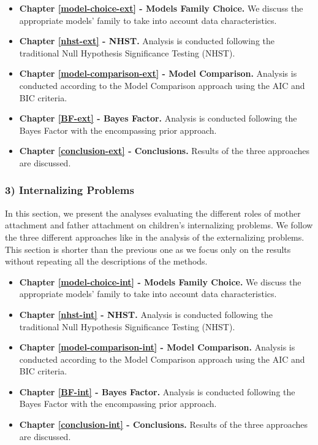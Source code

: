 \documentclass[
]{book}
\providecommand{\tightlist}{%
  \setlength{\itemsep}{0pt}\setlength{\parskip}{0pt}}
\begin{document}
\begin{itemize}
\tightlist
\item
  \textbf{Chapter \ref{model-choice-ext} - Models Family Choice.} We discuss the appropriate models' family to take into account data characteristics.
\item
  \textbf{Chapter \ref{nhst-ext} - NHST.} Analysis is conducted following the traditional Null Hypothesis Significance Testing (NHST).
\item
  \textbf{Chapter \ref{model-comparison-ext} - Model Comparison.} Analysis is conducted according to the Model Comparison approach using the AIC and BIC criteria.
\item
  \textbf{Chapter \ref{BF-ext} - Bayes Factor.} Analysis is conducted following the Bayes Factor with the encompassing prior approach.
\item
  \textbf{Chapter \ref{conclusion-ext} - Conclusions.} Results of the three approaches are discussed.
\end{itemize}

\hypertarget{internalizing-problems}{%
\subsubsection*{3) Internalizing Problems}\label{internalizing-problems}}

In this section, we present the analyses evaluating the different roles of mother attachment and father attachment on children's internalizing problems. We follow the three different approaches like in the analysis of the externalizing problems. This section is shorter than the previous one as we focus only on the results without repeating all the descriptions of the methods.

\begin{itemize}
\tightlist
\item
  \textbf{Chapter \ref{model-choice-int} - Models Family Choice.} We discuss the appropriate models' family to take into account data characteristics.
\item
  \textbf{Chapter \ref{nhst-int} - NHST.} Analysis is conducted following the traditional Null Hypothesis Significance Testing (NHST).
\item
  \textbf{Chapter \ref{model-comparison-int} - Model Comparison.} Analysis is conducted according to the Model Comparison approach using the AIC and BIC criteria.
\item
  \textbf{Chapter \ref{BF-int} - Bayes Factor.} Analysis is conducted following the Bayes Factor with the encompassing prior approach.
\item
  \textbf{Chapter \ref{conclusion-int} - Conclusions.} Results of the three approaches are discussed.
\end{itemize}
\end{document}
